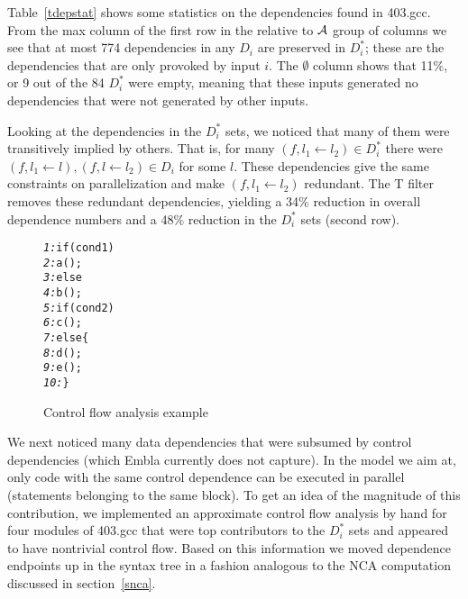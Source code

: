 \documentclass[times, 10pt,twocolumn]{article}
\begin{document}
Table~\ref{tdepstat} shows some statistics on the dependencies found
in 403.gcc. From the max column of the first row in the relative to $\cal A$ group of columns
we see that at most 774
dependencies in any $D_i$ are preserved in $D_i^{\ast}$; these are the dependencies 
that are only provoked by input $i$. The $\emptyset$ column shows that 11\%, or 9 out of the
84 $D_i^{\ast}$ were empty, meaning that these inputs generated no dependencies
that were not generated by other inputs.

Looking at the dependencies in the $D_i^{\ast}$ sets, we noticed that many of them were 
transitively implied by others. That is, for many $(f, l_1 \leftarrow l_2) 
\in D_i^{\ast}$ there were $(f, l_1 \leftarrow l), (f, l \leftarrow l_2) \in D_i$ for some $l$.
These dependencies give the same constraints on parallelization and make $(f, l_1 \leftarrow l_2)$
redundant. The T filter removes these redundant dependencies, yielding a 34\% reduction in 
overall dependence numbers and a 48\% reduction in the $D_i^{\ast}$ sets (second row).

\begin{figure} \small
\hrulefill
\begin{alltt}
{\it 1:}   if( cond1 )
{\it 2:}     a();
{\it 3:}   else
{\it 4:}     b();
{\it 5:}   if( cond2 )
{\it 6:}     c();
{\it 7:}   else \{
{\it 8:}     d();
{\it 9:}     e();
{\it 10:}  \}
\end{alltt}
\hrulefill
\caption{Control flow analysis example} \label{fcfa}
\end{figure}

We next noticed many data dependencies that were subsumed by control
dependencies (which Embla currently does not capture). In the model we
aim at, only code with the same control dependence can be executed in 
parallel (statements belonging to the same block).
To get an idea
of the magnitude of this contribution, we implemented an approximate
control flow analysis by hand for four modules of 403.gcc that were
top contributors to the $D_i^{\ast}$ sets and appeared to have
nontrivial control flow. 
Based on this information we moved dependence endpoints up in the
syntax tree in a fashion analogous to the NCA computation discussed in
section~\ref{snca}. 
\end{document}
